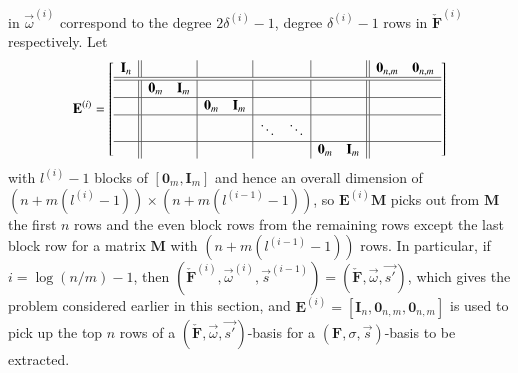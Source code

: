 in $\vec{\omega}^{\left(i\right)}$ correspond to the degree $2\delta^{\left(i\right)}-1$,
degree $\delta^{\left(i\right)}-1$ rows in $\check{\mathbf{F}}^{\left(i\right)}$
respectively. Let \[
\mathbf{E}^{\left(i\right)}=\left[\begin{array}{c||cc|cc|cc|cc||cc}
\mathbf{I}_{n} &  &  &  &  &  &  &  &  & \mathbf{0}_{n,m} & \mathbf{0}_{n,m}\\
\hline\hline  & \mathbf{0}_{m} & \mathbf{I}_{m} &  &  &  &  &  &  & \ \\
\hline  &  &  & \mathbf{0}_{m} & \mathbf{I}_{m} &  &  &  &  & \ \\
\hline  &  &  &  &  & \ddots & \ddots &  &  & \ \\
\hline  &  &  &  &  &  &  & \mathbf{0}_{m} & \mathbf{I}_{m}\end{array}\right]\]
 with $l^{\left(i\right)}-1$ blocks of $\left[\mathbf{0}_{m},\mathbf{I}_{m}\right]$
and hence an overall dimension of $(n+m(l^{\left(i\right)}-1))\times(n+m(l^{\left(i-1\right)}-1))$,
so $\mathbf{E}^{\left(i\right)}\mathbf{M}$ picks out from $\mathbf{M}$
the first $n$ rows and the even block rows from the remaining rows
except the last block row for a matrix $\mathbf{M}$ with $(n+m(l^{\left(i-1\right)}-1))$
rows. In particular, if $i=\log\left(n/m\right)-1$, then $(\check{\mathbf{F}}^{\left(i\right)},\vec{\omega}^{\left(i\right)},\vec{s}^{\left(i-1\right)})=(\check{\mathbf{F}},\vec{\omega},\vec{s'})$,
which gives the problem considered earlier in this section, and $\mathbf{E}^{\left(i\right)}=\left[\mathbf{I}_{n},\mathbf{0}_{n,m},\mathbf{0}_{n,m}\right]$
is used to pick up the top $n$ rows of a $(\check{\mathbf{F}},\vec{\omega},\vec{s'})$-basis
for a $\left(\mathbf{F},\sigma,\vec{s}\right)$-basis to be extracted.

